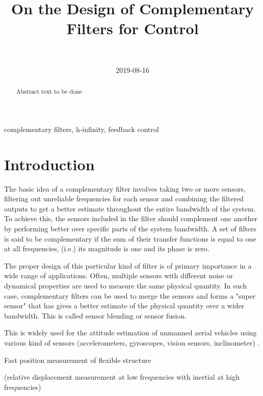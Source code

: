 \documentclass[9pt, technote, a4paper]{ieeeconf}
\author{\IEEEauthorblockN{Dehaeze Thomas\IEEEauthorrefmark{*}, Vermat Mohit and Collette Christophe} \\ \IEEEauthorblockA{Precision Mechatronics Laboratory, ULB\\ Brussels, Belgium\\ Email: \IEEEauthorrefmark{*}dehaeze.thomas@gmail.com}}
\date{2019-08-16}
\title{On the Design of Complementary Filters for Control}
\begin{document}
\maketitle


\begin{abstract}
Abstract text to be done
\end{abstract}

\begin{IEEEkeywords}
complementary filters, h-infinity, feedback control
\end{IEEEkeywords}

\section{Introduction}
\label{sec:org1592c87}
  \label{sec:introduction}
The basic idea of a complementary filter involves taking two or more sensors, filtering out unreliable frequencies for each sensor and combining the filtered outputs to get a better estimate throughout the entire bandwidth of the system.
To achieve this, the sensors included in the filter should complement one another by performing better over specific parts of the system bandwidth.
A set of filters is said to be complementary if the sum of their transfer functions is equal to one at all frequencies, (i.e.) its magnitude is one and its phase is zero.

The proper design of this particular kind of filter is of primary importance in a wide range of applications.
Often, multiple sensors with different noise or dynamical properties are used to measure the same physical quantity.
In such case, complementary filters can be used to merge the sensors and forms a "super sensor" that has gives a better estimate of the physical quantity over a wider bandwidth.
This is called sensor blending or sensor fusion.

This is widely used for the attitude estimation of unmanned aerial vehicles using various kind of sensors (accelerometers, gyroscopes, vision sensors, inclinometer) \cite{zimmermann92_high_bandw_orien_measur_contr,corke04_inert_visual_sensin_system_small_auton_helic,min15_compl_filter_desig_angle_estim}.

\cite{shaw90_bandw_enhan_posit_measur_using_measur_accel} Fast position measurement of flexible structure

\cite{matichard15_seism_isolat_advan_ligo} (relative displacement measurement at low frequencies with inertial at high frequencies)
\end{document}
